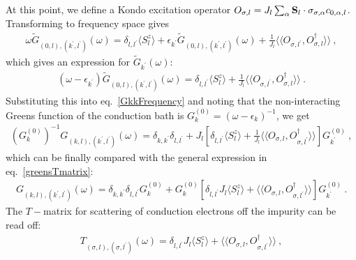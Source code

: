 At this point, we define a Kondo excitation operator \(O_{\sigma,l} = J_l\sum_{\alpha} {\bf S}_l\cdot \sigma_{\sigma,\alpha} c_{0,\alpha,l}\). Transforming to frequency space gives
\begin{equation}\begin{aligned}
\omega \tilde G_{(0,l),(k^\prime,l^\prime)}(\omega) = \delta_{l,l^\prime}\langle S_l^z \rangle + \epsilon_{k^\prime} \tilde G_{(0,l),(k^\prime,l^\prime)}(\omega)  + \frac{1}{J_{l}} \langle \langle O_{\sigma,l^\prime}, O^\dagger_{\sigma,l} \rangle  \rangle ~,
\end{aligned}\end{equation}
which gives an expression for \(\tilde G_{k^\prime}(\omega)\):
\begin{equation}\begin{aligned}
	(\omega - \epsilon_{k^\prime})\tilde G_{(0,l),(k^\prime,l^\prime)}(\omega) = \delta_{l,l^\prime}\langle S_l^z \rangle + \frac{1}{J_{l}} \langle \langle O_{\sigma,l^\prime}, O^\dagger_{\sigma,l} \rangle  \rangle~.
\end{aligned}\end{equation}
Substituting this into eq.~\ref{GkkFrequency} and noting that the non-interacting Greens function of the conduction bath is \(G^{(0)}_k = (\omega - \epsilon_k)^{-1}\), we get
\begin{equation}\begin{aligned}
	(G^{(0)}_k)^{-1} G_{(k,l),(k^\prime,l^\prime)}(\omega) = \delta_{k,k^\prime}\delta_{l,l^\prime} + J_l\left[\delta_{l,l^\prime}\langle S_l^z \rangle + \frac{1}{J_l} \langle \langle O_{\sigma,l}, O^\dagger_{\sigma,l^\prime} \rangle  \rangle\right]G^{(0)}_{k^\prime}~,
\end{aligned}\end{equation}
which can be finally compared with the general expression in eq.~\ref{greensTmatrix}:
\begin{equation}\begin{aligned}
	G_{(k,l),(k^\prime,l^\prime)}(\omega) = \delta_{k,k^\prime}\delta_{l,l^\prime}G^{(0)}_k + G^{(0)}_k\left[\delta_{l,l^\prime}J_l\langle S_l^z \rangle + \langle \langle O_{\sigma,l}, O^\dagger_{\sigma,l^\prime} \rangle  \rangle\right]G^{(0)}_{k^\prime}~.
\end{aligned}\end{equation}
The \(T-\)matrix for scattering of conduction electrons off the impurity can be read off:
\begin{equation}\begin{aligned}
	T_{(\sigma,l),(\sigma,l^\prime)}(\omega) = \delta_{l,l^\prime}J_l\langle S_l^z \rangle + \langle \langle O_{\sigma,l}, O^\dagger_{\sigma,l^\prime} \rangle  \rangle~,
\end{aligned}\end{equation}
